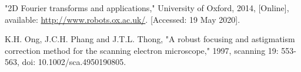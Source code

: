 \documentclass[12pt, conference]{IEEEtran}
\begin{document}
\begin{thebibliography}{00}
    "2D Fourier transforms and applications," University of Oxford, 2014, [Online], available: \url{http://www.robots.ox.ac.uk/}. [Accessed: 19 May 2020].

    
    K.H. Ong, J.C.H. Phang and J.T.L. Thong, "A robust focusing and astigmatism correction method for the scanning electron microscope," 1997, scanning 19: 553-563, doi: 10.1002/sca.4950190805.

\end{thebibliography}
\end{document}
